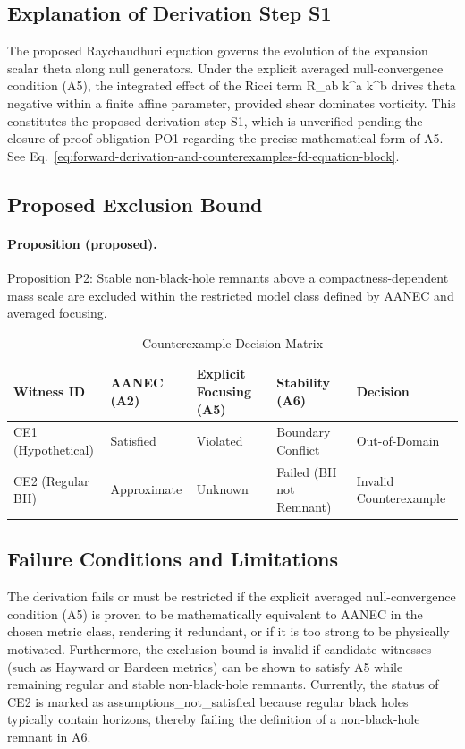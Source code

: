 \documentclass[conference]{IEEEtran}
\begin{document}
\subsection{Explanation of Derivation Step S1}
The proposed Raychaudhuri equation governs the evolution of the expansion scalar theta along null generators. Under the explicit averaged null-convergence condition (A5), the integrated effect of the Ricci term R\_ab k\textasciicircum{}a k\textasciicircum{}b drives theta negative within a finite affine parameter, provided shear dominates vorticity. This constitutes the proposed derivation step S1, which is unverified pending the closure of proof obligation PO1 regarding the precise mathematical form of A5. See Eq.~\eqref{eq:forward-derivation-and-counterexamples-fd-equation-block}.

\subsection{Proposed Exclusion Bound}
\paragraph{Proposition (proposed).} Proposition P2: Stable non-black-hole remnants above a compactness-dependent mass scale are excluded within the restricted model class defined by AANEC and averaged focusing.

\begin{table}[htbp]
\centering
\footnotesize
\setlength{\tabcolsep}{3pt}
\renewcommand{\arraystretch}{1.12}
\caption{Counterexample Decision Matrix}
\label{tab:forward-derivation-and-counterexamples-fd-counterexample-matrix}
\begin{tabular}{|p{}|p{}|p{}|p{}|p{}|}
\hline
Witness ID & AANEC (A2) & Explicit Focusing (A5) & Stability (A6) & Decision \\\hline
CE1 (Hypothetical) & Satisfied & Violated & Boundary Conflict & Out-of-Domain \\\hline
CE2 (Regular BH) & Approximate & Unknown & Failed (BH not Remnant) & Invalid Counterexample \\\hline
\end{tabular}
\end{table}

\subsection{Failure Conditions and Limitations}
The derivation fails or must be restricted if the explicit averaged null-convergence condition (A5) is proven to be mathematically equivalent to AANEC in the chosen metric class, rendering it redundant, or if it is too strong to be physically motivated. Furthermore, the exclusion bound is invalid if candidate witnesses (such as Hayward or Bardeen metrics) can be shown to satisfy A5 while remaining regular and stable non-black-hole remnants. Currently, the status of CE2 is marked as assumptions\_not\_satisfied because regular black holes typically contain horizons, thereby failing the definition of a non-black-hole remnant in A6.
\end{document}
